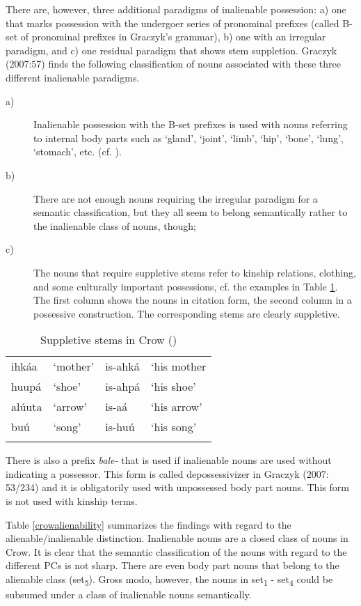 \documentclass[output=paper]{LSP/langsci}
\begin{document}
There are, however, three additional paradigms of inalienable possession: a) one that marks possession with the undergoer series of pronominal prefixes (called B-set of pronominal prefixes in Graczyk's grammar), b) one with an irregular paradigm, and c) one residual paradigm that shows stem suppletion. Graczyk (2007:57) finds the following classification of nouns associated with these three different inalienable paradigms.

\begin{description}
\item[a)] Inalienable possession with the B-set prefixes is used with nouns referring to internal body parts such as `gland', `joint', `limb', `hip', `bone', `lung', `stomach', etc. (cf. \citealt[57]{Graczyk2007}).

\item[b)] There are not enough nouns requiring the irregular paradigm for a semantic classification, but they all seem to belong semantically rather to the inalienable class of nouns, though;

\item[c)] The nouns that require suppletive stems refer to kinship relations, clothing, and some culturally important possessions, cf. the examples in Table \ref{crowsuppletion}. The first column shows the nouns in citation form, the second column in a possessive construction. The corresponding stems are clearly suppletive. 
\end{description}

\begin{table}
\caption{Suppletive stems in Crow (\citealt[58]{Graczyk2007})} \label{crowsuppletion}
\begin{tabular}[h]{ l l l l}
\lsptoprule
 ihkáa	 & `mother'	& is-ahká	& `his mother \\
 huupá & `shoe' &  is-ahpá	 &  `his shoe'\\
alúuta &  `arrow' & is-aá &  `his arrow'\\
buú & `song'	&  is-huú & `his song'\\
\lspbottomrule
\end{tabular}
\end{table}

There is also a prefix \textit{bale-} that is used if inalienable nouns are used without indicating a possessor. This form is called depossessivizer in Graczyk (2007: 53/234) and it is obligatorily used with unpossessed body part nouns. This form is not used with kinship terms.

Table \ref{crowalienability} summarizes the findings with regard to the alienable/inalienable distinction. Inalienable nouns are a closed class of nouns in Crow. It is clear that the semantic classification of the nouns with regard to the different PCs is not sharp. There are even body part nouns that belong to the alienable class (set\textsubscript{5}). Gross modo, however, the nouns in set\textsubscript{1} - set\textsubscript{4} could be subsumed under a class of inalienable nouns semantically.
\end{document}
